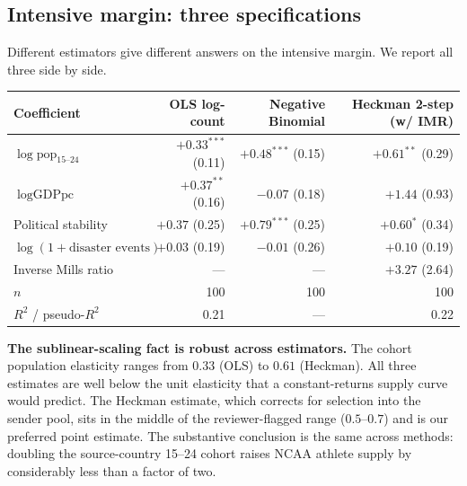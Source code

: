 \documentclass[11pt]{article}
\begin{document}
\subsection{Intensive margin: three specifications}
\label{sec:intensive}

Different estimators give different answers on the intensive
margin. We report all three side by side.

\begin{center}
\footnotesize
\begin{tabular}{lrrr}
\toprule
Coefficient                             & OLS log-count & Negative Binomial & Heckman 2-step (w/ IMR) \\
\midrule
$\log\text{pop}_{15\text{--}24}$        & $\mathbf{+0.33^{***}}$ (0.11) & $\mathbf{+0.48^{***}}$ (0.15) & $\mathbf{+0.61^{**}}$ (0.29) \\
$\log\text{GDPpc}$                      & $\mathbf{+0.37^{**}}$ (0.16)  & $-0.07$ (0.18)               & $+1.44$ (0.93) \\
Political stability                     & $+0.37$ (0.25)               & $\mathbf{+0.79^{***}}$ (0.25) & $+0.60^{*}$ (0.34) \\
$\log(1+\text{disaster events})$        & $+0.03$ (0.19)               & $-0.01$ (0.26)               & $+0.10$ (0.19) \\
Inverse Mills ratio                     & ---                          & ---                          & $+3.27$ (2.64) \\
\midrule
$n$                                     & 100                          & 100                          & 100 \\
$R^2$ / pseudo-$R^2$                    & 0.21                         & ---                          & 0.22 \\
\bottomrule
\end{tabular}
\end{center}

\textbf{The sublinear-scaling fact is robust across estimators.}\quad
The cohort population elasticity ranges from $0.33$ (OLS) to $0.61$
(Heckman). All three estimates are well below the unit elasticity
that a constant-returns supply curve would predict. The Heckman
estimate, which corrects for selection into the sender pool, sits in
the middle of the reviewer-flagged range ($0.5$--$0.7$) and is our
preferred point estimate. The substantive conclusion is the same
across methods: doubling the source-country 15--24 cohort raises NCAA
athlete supply by considerably less than a factor of two.
\end{document}
